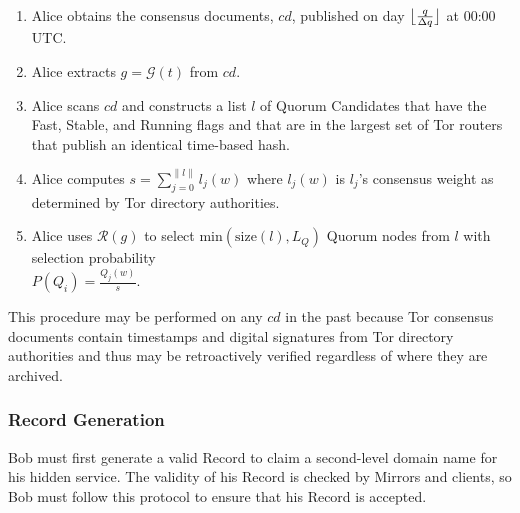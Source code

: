 \documentclass[conference]{IEEEtran}
\DeclarePairedDelimiter{\floor}{\lfloor}{\rfloor}
\begin{document}
\begin{enumerate}
	\item Alice obtains the consensus documents, $ \mathit{cd} $, published on day $ \floor[\big]{\frac{q}{\Delta q}} $ at 00:00 UTC.
	\item Alice extracts $ g = \mathcal{G}(t) $ from $ cd $.
	\item Alice scans $ \mathit{cd} $ and constructs a list $ l $ of Quorum Candidates that have the Fast, Stable, and Running flags and that are in the largest set of Tor routers that publish an identical time-based hash.
	\item Alice computes $ s = \sum_{j=0}^{\| l \|} l_{j}(w) $ where $ l_{j}(w) $ is $ l_{j} $'s consensus weight as determined by Tor directory authorities.
	\item Alice uses $ \mathcal{R}(g) $ to select $ \mathrm{min}(\mathrm{size}(l), L_{Q}) $ Quorum nodes from $ l $ with selection probability \\ $ P (Q_{i}) = \frac{Q_{j}(w)}{s} $.
\end{enumerate}

This procedure may be performed on any $ \mathit{cd} $ in the past because Tor consensus documents contain timestamps and digital signatures from Tor directory authorities and thus may be retroactively verified regardless of where they are archived.

\subsubsection{Record Generation}
\label{sec:RecordGeneration}

Bob must first generate a valid Record to claim a second-level domain name for his hidden service. The validity of his Record is checked by Mirrors and clients, so Bob must follow this protocol to ensure that his Record is accepted.
\end{document}
